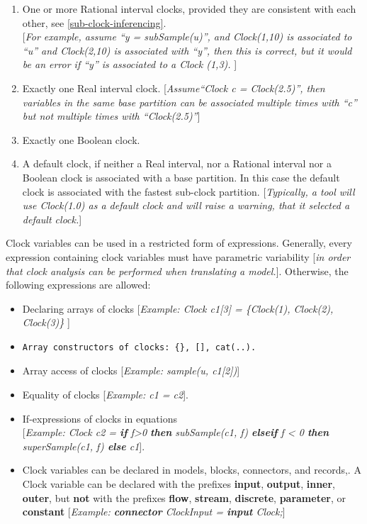 \documentclass[10pt,a4paper]{report}
\renewcommand{\labelenumi}{\arabic{enumi}.}
\begin{document}
\begin{enumerate}
\def\labelenumi{\arabic{enumi}.}
\item
  One or more Rational interval clocks, provided they are consistent
  with each other, see \ref{sub-clock-inferencing}.\\
  {[}\emph{For example, assume ``y = subSample(u)'', and Clock(1,10) is
  associated to ``u'' and Clock(2,10) is associated with ``y'', then
  this is correct, but it would be an error if ``y'' is associated to a
  Clock (1,3).} {]}
\item
  Exactly one Real interval clock. {[}\emph{Assume``Clock c =
  Clock(2.5)'', then variables in the same base partition can be
  associated multiple times with ``c'' but not multiple times with
  ``Clock(2.5)''}{]}
\item
  Exactly one Boolean clock.
\item
  A default clock, if neither a Real interval, nor a Rational interval
  nor a Boolean clock is associated with a base partition. In this case
  the default clock is associated with the fastest sub-clock partition.
  {[}\emph{Typically, a tool will use Clock(1.0) as a default clock and
  will raise a warning, that it selected a default clock.}{]}
\end{enumerate}

Clock variables can be used in a restricted form of expressions.
Generally, every expression containing clock variables must have
parametric variability {[}\emph{in order that clock analysis can be
performed when translating a model.}{]}. Otherwise, the following
expressions are allowed:

\begin{itemize}
\item
  Declaring arrays of clocks {[}\emph{Example: Clock c1{[}3{]} =
  \{Clock(1), Clock(2), Clock(3)\}} {]}
\end{itemize}

\begin{itemize}
\item
\begin{lstlisting}[language=modelica]
  Array constructors of clocks: {}, [], cat(..).
\end{lstlisting}
\item
  Array access of clocks {[}\emph{Example: sample(u, c1{[}2{]})}{]}
\item
  Equality of clocks {[}\emph{Example: c1 = c2}{]}.
\item
  If-expressions of clocks in equations\\
  {[}\emph{Example: Clock c2 = \textbf{if} f\textgreater{}0
  \textbf{then} subSample(c1, f) \textbf{elseif} f \textless{} 0
  \textbf{then} superSample(c1, f) \textbf{else} c1}{]}.
\item
  Clock variables can be declared in models, blocks, connectors, and
  records,. A Clock variable can be declared with the prefixes
  \textbf{input}, \textbf{output}, \textbf{inner}, \textbf{outer}, but
  \textbf{not} with the prefixes \textbf{flow}, \textbf{stream},
  \textbf{discrete}, \textbf{parameter}, or \textbf{constant}
  {[}\emph{Example: \textbf{connector} ClockInput = \textbf{input}
  Clock;}{]}
\end{itemize}
\end{document}
